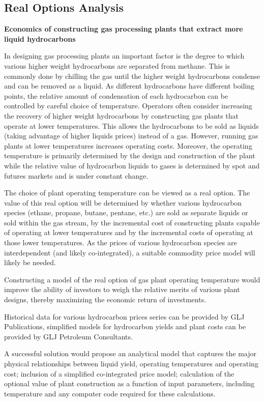 \documentclass[12pt,a4paper]{article}
\begin{document}
\subsection{Real Options Analysis}

{\bf Economics of constructing gas processing plants that extract more liquid hydrocarbons }

In designing gas processing plants an important factor is the degree to which various higher weight hydrocarbons are separated from methane. This is commonly done by chilling the gas until the higher weight hydrocarbons condense and can be removed as a liquid. As different hydrocarbons have different boiling points, the relative amount of condensation of each hydrocarbon can be controlled by careful choice of temperature. Operators often consider increasing the recovery of higher weight hydrocarbons by constructing gas plants that operate at lower temperatures. This allows the hydrocarbons to be sold as liquids (taking advantage of higher liquids prices) instead of a gas. However, running gas plants at lower temperatures increases operating costs. Moreover, the operating temperature is primarily determined by the design and construction of the plant while the relative value of hydrocarbon liquids to gases is determined by spot and futures markets and is under constant change.

The choice of plant operating temperature can be viewed as a real option. The value of this real option will be determined by whether various hydrocarbon species (ethane, propane, butane, pentane, etc.) are sold as separate liquids or sold within the gas stream, by the incremental cost of constructing plants capable of operating at lower temperatures and by the incremental costs of operating at those lower temperatures. As the prices of various hydrocarbon species are interdependent (and likely co-integrated), a suitable commodity price model will likely be needed.

Constructing a model of the real option of gas plant operating temperature would improve the ability of investors to weigh the relative merits of various plant designs, thereby maximizing the economic return of investments.

Historical data for various hydrocarbon prices series can be provided by GLJ Publications, simplified models for hydrocarbon yields and plant costs can be provided by GLJ Petroleum Consultants.

A successful solution would propose an analytical model that captures the major physical relationships between liquid yield, operating temperatures and operating cost; inclusion of a simplified co-integrated price model; calculation of the optional value of plant construction as a function of input parameters, including temperature and any computer code required for these calculations.
\end{document}

